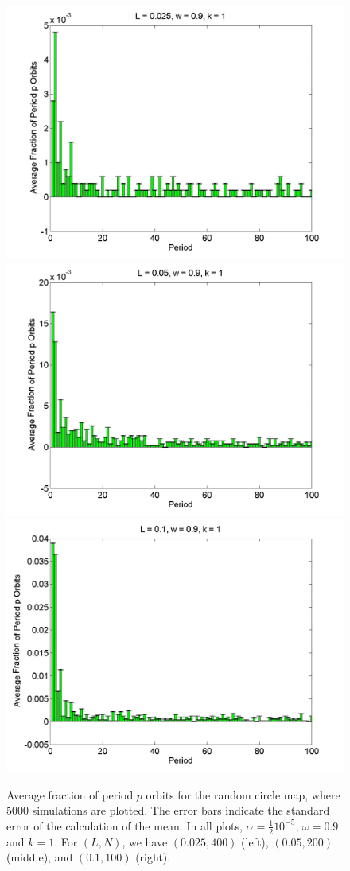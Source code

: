 \begin{figure}[H]\linespread{1}
\caption[Average fraction of period $p$ orbits for the random circle
map (uniform distribution), for $\alpha = \frac{1}{2}10^{-5}$, $\omega=0.9$ and $k=1$]{Average fraction of period $p$ orbits for the random circle
map, where 5000 simulations are plotted. The error bars indicate
the standard error of the calculation of the mean. In all plots,
$\alpha = \frac{1}{2}10^{-5}$, $\omega=0.9$ and $k=1$. For $(L,N)$,
we have $(0.025, 400)$ (left), $(0.05, 200)$
(middle), and $(0.1, 100)$ (right).}\label{fig:rcirchist_u_ha1}
	\begin{center}
\includegraphics[width=.33\textwidth]{figs/rcirc_hist_u_halfa_L_0025_w_09_k_1_sims_5000.png}\hfill
\includegraphics[width=.33\textwidth]{figs/rcirc_hist_u_halfa_L_005_w_09_k_1_sims_5000.png}\hfill
\includegraphics[width=.33\textwidth]{figs/rcirc_hist_u_halfa_L_01_w_09_k_1_sims_5000.png}
	\end{center}
\end{figure}

